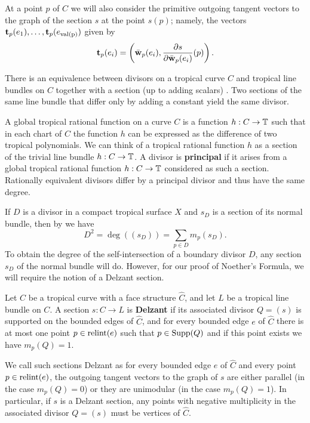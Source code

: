 At a point $p$ of $C$ we will also consider the primitive outgoing tangent vectors to the graph of the section $s$ at the point $s(p)$; namely, the vectors ${{\bf t}}_p(e_1), \dots, {{\bf t}}_p(e_{\rm val(p)})$
given by 
\begin{equation}\label{eq:tangentvectors}
{{\bf t}}_p(e_i) = \left( \bar{{\bf w}}_p(e_i),  \frac{\partial s}{\partial  \bar{{\bf w}}_p(e_i)}(p)\right).
\end{equation}

There is an equivalence between divisors on a tropical curve $C$ and tropical line bundles on $C$ together with a section (up to adding scalars) \cite[Proposition 4.6]{MikZha:Jac}.
Two sections  of the same line bundle that differ only by adding a constant yield the same divisor.

A global tropical rational function on a curve $C$ is a function $h : C \to \mathbb{T}$ such that in each chart of $C$ the function $h$ can be expressed as the difference of two tropical polynomials. We can think of a tropical rational function $h$ as a section of the trivial line bundle $h :C \to \mathbb{T}$.  A divisor is {\bf principal} if it arises from a global tropical rational function $h: C \to \mathbb{T}$ considered as such a section. Rationally equivalent divisors differ by a principal divisor and thus have the same degree. 

If $D$ is a divisor in a compact tropical surface $X$ and $s_D$ is a section of its normal bundle, then by \cite[Section 3.5.4]{Shaw:Surf} we have 
\begin{equation}\label{eq:boundaryselfintersection}
D^2 = \deg((s_D)) = \sum_{p \in D} m_p(s_D).
\end{equation}
To obtain the degree of the self-intersection of a boundary divisor $D$, any section $s_D$ of the normal bundle will do. However, for our proof of Noether's Formula, we will require the notion of a Delzant section. 

\begin{defi}\label{def:admissible}
Let $C$ be a tropical curve with  a face structure $\hat{C}$, and let $L$ be a tropical line bundle on $C$. A section $s : C \to L $ is  {\bf Delzant} if its associated divisor $Q = (s)$ is  supported on the bounded edges of $\hat C$, and for every bounded edge $e$ of $\hat{C}$ there is at most one point $p \in {\rm relint}(e) $ such that $p \in {\rm Supp}(Q)$ and if this point exists we have  $m_p(Q) = 1$. 
\end{defi}


We call such sections Delzant as for every bounded edge $e$ of $\hat C$ and every point $p \in {\rm relint}(e)$, the outgoing tangent vectors to the graph of $s$ are either parallel (in the case $m_p(Q) = 0$) or they are unimodular (in the case $m_p(Q) = 1$). 
 In particular, if $s$ is a Delzant  section, any points with negative multiplicity in the associated divisor $Q = (s)$ must be vertices of $\hat{C}$. 


